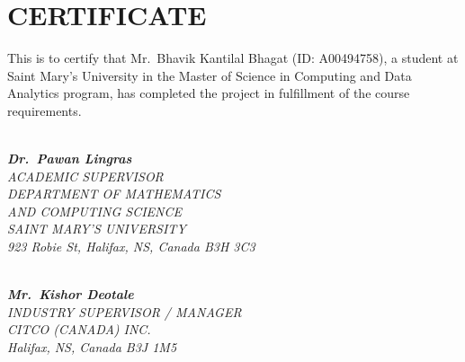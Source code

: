 \chapter*{CERTIFICATE}

This is to certify that Mr.\ Bhavik Kantilal Bhagat (ID: A00494758), a student at Saint Mary's University in the Master of Science in Computing and Data Analytics program, has completed the project in fulfillment of the course requirements.

\bigskip
\bigskip

\vfill

\noindent
\begin{minipage}[t]{0.48\textwidth}
\makebox[4.5cm]{\dotfill} \\[0.5em]
\textit{\textbf{Dr.\ Pawan Lingras}} \\
\textit{ACADEMIC SUPERVISOR} \\
\textit{DEPARTMENT OF MATHEMATICS} \\
\textit{AND COMPUTING SCIENCE} \\
\textit{SAINT MARY'S UNIVERSITY} \\
\textit{923 Robie St, Halifax, NS, Canada B3H 3C3}
\end{minipage}%
\hfill%
\begin{minipage}[t]{0.48\textwidth}
\raggedleft
\makebox[4.5cm]{\dotfill} \\[0.5em]
\textit{\textbf{Mr.\ Kishor Deotale}} \\
\textit{INDUSTRY SUPERVISOR / MANAGER} \\
\textit{CITCO (CANADA) INC.} \\
\textit{Halifax, NS, Canada B3J 1M5}
\end{minipage}

\vfill

\clearpage
